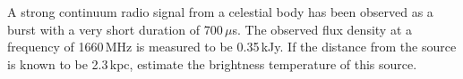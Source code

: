 A strong continuum radio signal from a celestial body has been observed as a
burst with a very short duration of 700\,$\mu$s. The observed flux density at
a frequency of 1660\,MHz is measured to be 0.35\,kJy. If the distance from the
source is known to be 2.3\,kpc, estimate the brightness temperature of this
source.
